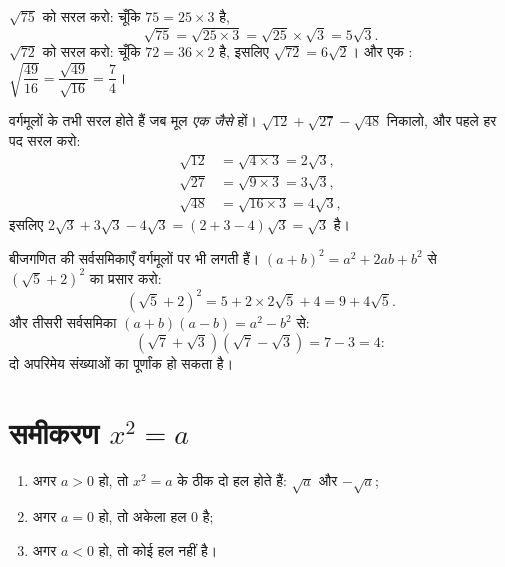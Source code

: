\begin{example}\label{ex:g9:sqrt:simplify}
$\sqrt{75}$ को सरल करो: चूँकि $75 = 25 \times 3$ है,
\[
\sqrt{75} = \sqrt{25 \times 3} = \sqrt{25} \times \sqrt 3 = 5\sqrt3 .
\]
$\sqrt{72}$ को सरल करो: चूँकि $72 = 36 \times 2$ है, इसलिए
$\sqrt{72} = 6\sqrt2$। और एक :
$\sqrt{\dfrac{49}{16}} = \dfrac{\sqrt{49}}{\sqrt{16}} = \dfrac74$।
\end{example}

\begin{example}[वर्गमूल जोड़ना]\label{ex:g9:sqrt:add}
वर्गमूलों के  तभी सरल होते हैं जब मूल \emph{एक जैसे} हों।
$\sqrt{12} + \sqrt{27} - \sqrt{48}$ निकालो, और पहले हर पद सरल करो:
\begin{align*}
\sqrt{12} &= \sqrt{4 \times 3} = 2\sqrt3, \\
\sqrt{27} &= \sqrt{9 \times 3} = 3\sqrt3, \\
\sqrt{48} &= \sqrt{16 \times 3} = 4\sqrt3,
\end{align*}
इसलिए  $2\sqrt3 + 3\sqrt3 - 4\sqrt3 = (2 + 3 - 4)\sqrt3 = \sqrt3$ है।
\end{example}

\begin{example}[वर्गमूलों के साथ प्रसार]\label{ex:g9:sqrt:expand}
बीजगणित की सर्वसमिकाएँ वर्गमूलों पर भी लगती हैं।
$(a+b)^2 = a^2 + 2ab + b^2$ से $\left(\sqrt5 + 2\right)^2$ का प्रसार करो:
\[
\left(\sqrt5 + 2\right)^2 = 5 + 2 \times 2\sqrt5 + 4 = 9 + 4\sqrt5 .
\]
और तीसरी सर्वसमिका $(a+b)(a-b) = a^2 - b^2$ से:
\[
\left(\sqrt7 + \sqrt3\right)\left(\sqrt7 - \sqrt3\right) = 7 - 3 = 4 :
\]
दो अपरिमेय संख्याओं का  पूर्णांक हो सकता है।
\end{example}

\section{समीकरण \texorpdfstring{$x^2 = a$}{x2 = a}}

\begin{theorem}[$x^2 = a$ हल करना]\label{thm:g9:sqrt:equation}
\begin{enumerate}
  \item अगर $a > 0$ हो, तो  $x^2 = a$ के ठीक दो हल होते हैं:
        $\sqrt a$ और $-\sqrt a$;
  \item अगर $a = 0$ हो, तो अकेला हल $0$ है;
  \item अगर $a < 0$ हो, तो कोई हल नहीं है।
\end{enumerate}
\end{theorem}

